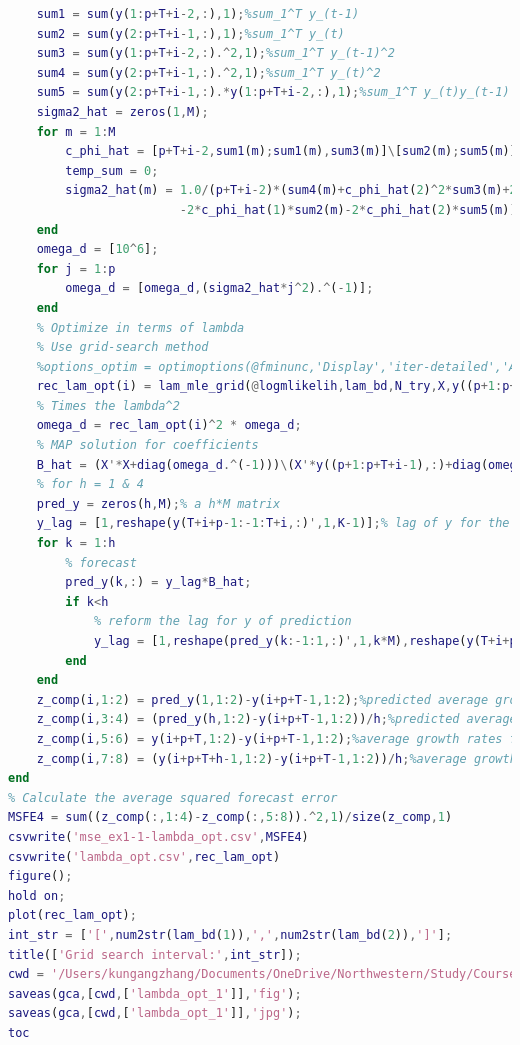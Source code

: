 \documentclass[11pt, oneside]{article}   	%
\begin{document}
\begin{lstlisting}[language=Matlab ,caption={Matlab code for problem 1.}, label={code:prob1}]
    % Follow Hamilton 1994 to get the MLE for variance
    sum1 = sum(y(1:p+T+i-2,:),1);%sum_1^T y_(t-1)
    sum2 = sum(y(2:p+T+i-1,:),1);%sum_1^T y_(t)
    sum3 = sum(y(1:p+T+i-2,:).^2,1);%sum_1^T y_(t-1)^2
    sum4 = sum(y(2:p+T+i-1,:).^2,1);%sum_1^T y_(t)^2
    sum5 = sum(y(2:p+T+i-1,:).*y(1:p+T+i-2,:),1);%sum_1^T y_(t)y_(t-1)
    sigma2_hat = zeros(1,M);
    for m = 1:M
        c_phi_hat = [p+T+i-2,sum1(m);sum1(m),sum3(m)]\[sum2(m);sum5(m)];% c_phi_hat = [c_hat,phi_hat]
        temp_sum = 0;
        sigma2_hat(m) = 1.0/(p+T+i-2)*(sum4(m)+c_phi_hat(2)^2*sum3(m)+2*c_phi_hat(1)*c_phi_hat(2)*sum1(m)...
                        -2*c_phi_hat(1)*sum2(m)-2*c_phi_hat(2)*sum5(m))+c_phi_hat(1)^2;
    end
    omega_d = [10^6];
    for j = 1:p
        omega_d = [omega_d,(sigma2_hat*j^2).^(-1)];
    end
    % Optimize in terms of lambda
    % Use grid-search method
    %options_optim = optimoptions(@fminunc,'Display','iter-detailed','Algorithm','quasi-newton','SpecifyObjectiveGradient',true,'MaxIterations',1000);
    rec_lam_opt(i) = lam_mle_grid(@logmlikelih,lam_bd,N_try,X,y((p+1:p+T+i-1),:),sigma2_hat,omega_d,b_hat',M,T+i-1,d);
    % Times the lambda^2
    omega_d = rec_lam_opt(i)^2 * omega_d;
    % MAP solution for coefficients
    B_hat = (X'*X+diag(omega_d.^(-1)))\(X'*y((p+1:p+T+i-1),:)+diag(omega_d.^(-1))*b_hat');% a K*M matrix
    % for h = 1 & 4
    pred_y = zeros(h,M);% a h*M matrix
    y_lag = [1,reshape(y(T+i+p-1:-1:T+i,:)',1,K-1)];% lag of y for the prediction
    for k = 1:h
        % forecast
        pred_y(k,:) = y_lag*B_hat;
        if k<h
            % reform the lag for y of prediction
            y_lag = [1,reshape(pred_y(k:-1:1,:)',1,k*M),reshape(y(T+i+p-1:-1:T+i+k,:)',1,K-1-k*M)];
        end
    end
    z_comp(i,1:2) = pred_y(1,1:2)-y(i+p+T-1,1:2);%predicted average growth rates for one quarter of (i) log-real GDP and (ii) log-GDP delector
    z_comp(i,3:4) = (pred_y(h,1:2)-y(i+p+T-1,1:2))/h;%predicted average growth rates for h quarters of (i) log-real GDP and (ii) log-GDP delector
    z_comp(i,5:6) = y(i+p+T,1:2)-y(i+p+T-1,1:2);%average growth rates for one quarter of (i) log-real GDP and (ii) log-GDP delector
    z_comp(i,7:8) = (y(i+p+T+h-1,1:2)-y(i+p+T-1,1:2))/h;%average growth rates for h quarters of (i) log-real GDP and (ii) log-GDP delector
end
% Calculate the average squared forecast error
MSFE4 = sum((z_comp(:,1:4)-z_comp(:,5:8)).^2,1)/size(z_comp,1)
csvwrite('mse_ex1-1-lambda_opt.csv',MSFE4)
csvwrite('lambda_opt.csv',rec_lam_opt)
figure();
hold on;
plot(rec_lam_opt);
int_str = ['[',num2str(lam_bd(1)),',',num2str(lam_bd(2)),']'];
title(['Grid search interval:',int_str]);
cwd = '/Users/kungangzhang/Documents/OneDrive/Northwestern/Study/Courses/ECON-482/HW1/';
saveas(gca,[cwd,['lambda_opt_1']],'fig');
saveas(gca,[cwd,['lambda_opt_1']],'jpg');
toc
\end{lstlisting}
\end{document}
